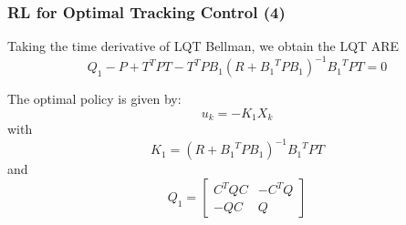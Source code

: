\documentclass{beamer}
\begin{document}
			\begin{frame}\frametitle{RL for Optimal Tracking Control (4)}
				\fontsize{8}{4}\selectfont
				Taking the time derivative of LQT Bellman, we obtain the LQT ARE
				\begin{equation}
				Q_1 - P + T^TPT - T^TPB_1(R+{B_1}^TPB_1)^{-1}{B_1}^TPT = 0
				\end{equation}
				
				The optimal policy is given by:
				\begin{equation}
				u_k = -K_1X_k
				\end{equation}
				with
				\begin{equation}
				K_1 = (R+{B_1}^TPB_1)^{-1}{B_1}^TPT
				\end{equation}	
				and 
				\begin{equation}
				Q_1 = \left[ \begin{array}{cc}
				C^TQC & -C^TQ \\ 
				-QC & Q
				\end{array} \right] 
				\end{equation}
				
			\end{frame}
			
\end{document}
